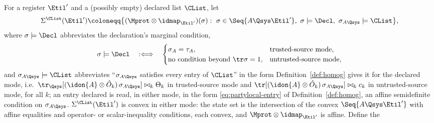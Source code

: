 
\begin{definition}
\label{def:hqkd-list}
For a register $\Etil'$ and a (possibly empty) declared list $\CList$,
let
\begin{equation}\label{eq:sigL}
  \Sigma^{\CList}(\Etil')\coloneqq
  \big\{(\Mprot\otimes\idmap_{\Etil'})(\sigma):\
  \sigma\in\Seq{A\Qsys\Etil'},\ \sigma\models\Decl,\
  \sigma_{A\Qsys}\models\CList\big\},
\end{equation}
where $\sigma\models\Decl$ abbreviates the declaration's marginal
condition,
\begin{equation}\label{eq:margcond}
  \sigma\models\Decl
  \quad:\Longleftrightarrow\quad
  \begin{cases}
    \sigma_A=\tau_A, & \text{trusted-source mode},\\
    \text{no condition beyond }\tr\sigma=1,
      & \text{untrusted-source mode},
  \end{cases}
\end{equation}
and $\sigma_{A\Qsys}\models\CList$ abbreviates ``$\sigma_{A\Qsys}$
satisfies every entry of $\CList$'' in the form
Definition~\ref{def:homog} gives it for the declared mode, i.e.\
$\tr_{\Qsys}[(\idon{A}\otimes\hat O_k)\,\sigma_{A\Qsys}]
\bowtie_k\Theta_k$ in trusted-source mode and
$\tr[(\idon{A}\otimes\hat O_k)\,\sigma_{A\Qsys}]\bowtie_k c_k$ in
untrusted-source mode, for all $k$; an entry declared 
is read, in either mode, in the form \eqref{eq:partylocal-entry} of
Definition~\ref{def:homog}, an affine semidefinite condition on
$\sigma_{A\Qsys}$. $\Sigma^{\CList}(\Etil')$ is
convex in either mode: the state set is the intersection of the convex
$\Seq{A\Qsys\Etil'}$ with affine equalities and operator- or
scalar-inequality conditions, each convex, and
$\Mprot\otimes\idmap_{\Etil'}$ is affine.
Define the

\end{definition}
